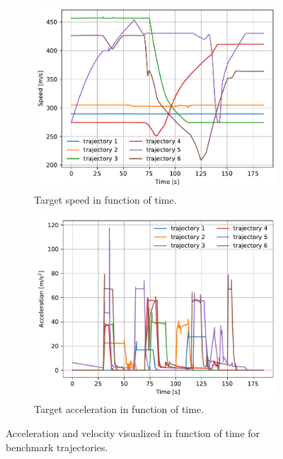 \documentclass[english, 12pt, a4paper, elec, utf8, a-1b, online]{aaltothesis}
\begin{document}
\begin{figure}[htb]
    \centering
    \begin{subfigure}{0.45\textwidth}
        \includegraphics[width=\linewidth]{figures/benchmark/velocities.pdf}
        \caption{Target speed in function of time.}
        \label{fig:benchmark_velocities}
    \end{subfigure}
    \hfill
    \begin{subfigure}{0.45\textwidth}
        \includegraphics[width=\linewidth]{figures/benchmark/accelerations.pdf}
        \caption{Target acceleration in function of time.}
        \label{fig:benchmark_acceleration}
    \end{subfigure}
    \label{fig:benchmark_vel_acc}
    \caption{Acceleration and velocity visualized in function of time for benchmark trajectories. }
\end{figure}
\end{document}
